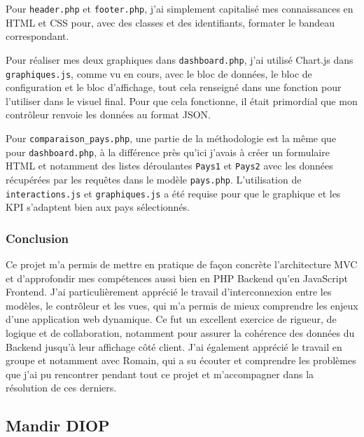 \documentclass[11pt]{article}
\begin{document}
Pour \texttt{header.php} et \texttt{footer.php}, j’ai simplement capitalisé mes connaissances en HTML et CSS pour, avec des classes et des identifiants, formater le bandeau correspondant.

Pour réaliser mes deux graphiques dans \texttt{dashboard.php}, j’ai utilisé Chart.js dans \texttt{graphiques.js}, comme vu en cours, avec le bloc de données, le bloc de configuration et le bloc d’affichage, tout cela renseigné dans une fonction pour l’utiliser dans le visuel final. Pour que cela fonctionne, il était primordial que mon contrôleur renvoie les données au format JSON.

Pour \texttt{comparaison\_pays.php}, une partie de la méthodologie est la même que pour \texttt{dashboard.php}, à la différence près qu’ici j’avais à créer un formulaire HTML et notamment des listes déroulantes \texttt{Pays1} et \texttt{Pays2} avec les données récupérées par les requêtes dans le modèle \texttt{pays.php}. L’utilisation de \texttt{interactions.js} et \texttt{graphiques.js} a été requise pour que le graphique et les KPI s’adaptent bien aux pays sélectionnés.

\subsubsection*{Conclusion}
Ce projet m’a permis de mettre en pratique de façon concrète l’architecture MVC et d’approfondir mes compétences aussi bien en PHP Backend qu’en JavaScript Frontend. J’ai particulièrement apprécié le travail d’interconnexion entre les modèles, le contrôleur et les vues, qui m’a permis de mieux comprendre les enjeux d’une application web dynamique. Ce fut un excellent exercice de rigueur, de logique et de collaboration, notamment pour assurer la cohérence des données du Backend jusqu’à leur affichage côté client. J’ai également apprécié le travail en groupe et notamment avec Romain, qui a su écouter et comprendre les problèmes que j’ai pu rencontrer pendant tout ce projet et m’accompagner dans la résolution de ces derniers.

\subsection*{Mandir DIOP}
\end{document}
